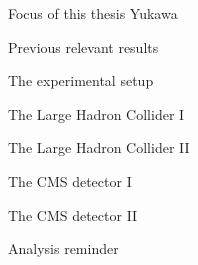 \documentclass[8pt]{beamer}
\begin{document}
\begin{frame}{Focus of this thesis}
\justifying
Yukawa
\end{frame}

\begin{frame}{Previous relevant results}
\justifying

\end{frame}










\begin{frame}[standout]
The experimental setup
\end{frame}

\begin{frame}{The Large Hadron Collider I}
\justifying

\end{frame}

\begin{frame}{The Large Hadron Collider II}
\justifying

\end{frame}

\begin{frame}{The CMS detector I}
\justifying

\end{frame}

\begin{frame}{The CMS detector II}
\justifying

\end{frame}












\begin{frame}[standout]
Analysis reminder
\end{frame}
\end{document}
